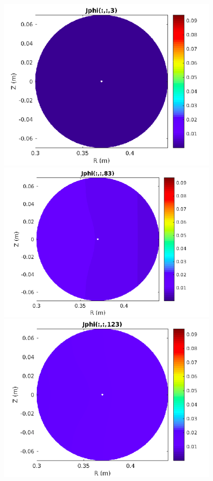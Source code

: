 \documentclass[12pt,oneside,a4paper]{abntex2}
\begin{document}
\begin{figure}[H]
\centering
\includegraphics[scale=0.4]{../SImulacao_breakdown/Adaptacao_nova/explicito/j3.png}  
\includegraphics[scale=0.4]{../SImulacao_breakdown/Adaptacao_nova/explicito/j83.png} 
\includegraphics[scale=0.4]{../SImulacao_breakdown/Adaptacao_nova/explicito/j123.png} 

\end{figure}
\end{document}
